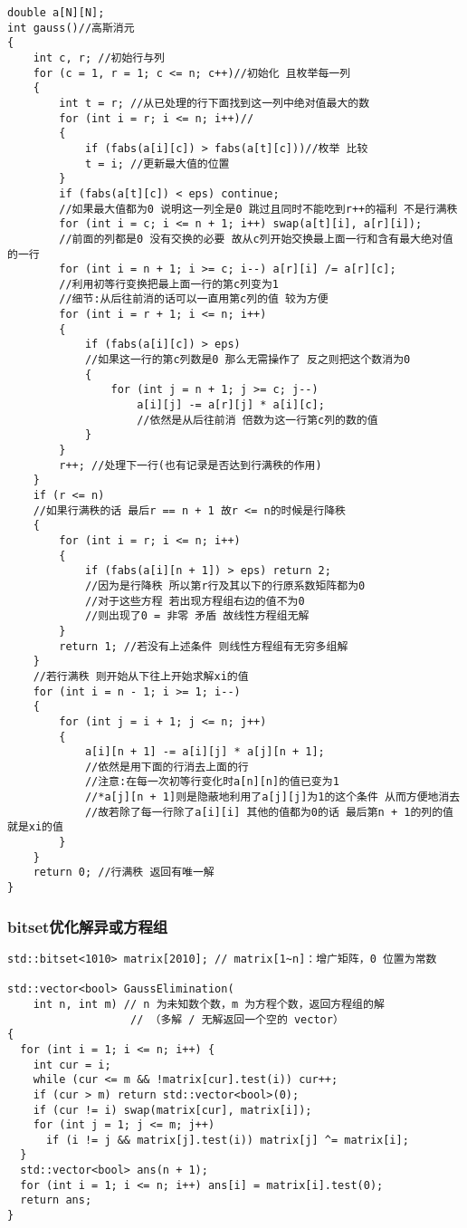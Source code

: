 \documentclass[a4paper, fontset=none]{ctexart}
\begin{document}
\begin{verbatim}
double a[N][N];
int gauss()//高斯消元
{
    int c, r; //初始行与列
    for (c = 1, r = 1; c <= n; c++)//初始化 且枚举每一列
    {
        int t = r; //从已处理的行下面找到这一列中绝对值最大的数
        for (int i = r; i <= n; i++)//
        {
            if (fabs(a[i][c]) > fabs(a[t][c]))//枚举 比较
            t = i; //更新最大值的位置
        }
        if (fabs(a[t][c]) < eps) continue;
        //如果最大值都为0 说明这一列全是0 跳过且同时不能吃到r++的福利 不是行满秩
        for (int i = c; i <= n + 1; i++) swap(a[t][i], a[r][i]);
        //前面的列都是0 没有交换的必要 故从c列开始交换最上面一行和含有最大绝对值的一行
        for (int i = n + 1; i >= c; i--) a[r][i] /= a[r][c];
        //利用初等行变换把最上面一行的第c列变为1
        //细节:从后往前消的话可以一直用第c列的值 较为方便
        for (int i = r + 1; i <= n; i++)
        {
            if (fabs(a[i][c]) > eps)
            //如果这一行的第c列数是0 那么无需操作了 反之则把这个数消为0
            {
                for (int j = n + 1; j >= c; j--)
                    a[i][j] -= a[r][j] * a[i][c];
                    //依然是从后往前消 倍数为这一行第c列的数的值
            }
        }
        r++; //处理下一行(也有记录是否达到行满秩的作用)
    }
    if (r <= n)
    //如果行满秩的话 最后r == n + 1 故r <= n的时候是行降秩
    {
        for (int i = r; i <= n; i++)
        {
            if (fabs(a[i][n + 1]) > eps) return 2;
            //因为是行降秩 所以第r行及其以下的行原系数矩阵都为0
            //对于这些方程 若出现方程组右边的值不为0
            //则出现了0 = 非零 矛盾 故线性方程组无解
        }
        return 1; //若没有上述条件 则线性方程组有无穷多组解
    }
    //若行满秩 则开始从下往上开始求解xi的值
    for (int i = n - 1; i >= 1; i--)
    {
        for (int j = i + 1; j <= n; j++)
        {
            a[i][n + 1] -= a[i][j] * a[j][n + 1];
            //依然是用下面的行消去上面的行
            //注意:在每一次初等行变化时a[n][n]的值已变为1
            //*a[j][n + 1]则是隐蔽地利用了a[j][j]为1的这个条件 从而方便地消去
            //故若除了每一行除了a[i][i] 其他的值都为0的话 最后第n + 1的列的值就是xi的值
        }
    }
    return 0; //行满秩 返回有唯一解
}
\end{verbatim}
\subsubsection{bitset优化解异或方程组}

\begin{verbatim}
std::bitset<1010> matrix[2010]; // matrix[1~n]：增广矩阵，0 位置为常数

std::vector<bool> GaussElimination(
    int n, int m) // n 为未知数个数，m 为方程个数，返回方程组的解
                   // （多解 / 无解返回一个空的 vector）
{
  for (int i = 1; i <= n; i++) {
    int cur = i;
    while (cur <= m && !matrix[cur].test(i)) cur++;
    if (cur > m) return std::vector<bool>(0);
    if (cur != i) swap(matrix[cur], matrix[i]);
    for (int j = 1; j <= m; j++)
      if (i != j && matrix[j].test(i)) matrix[j] ^= matrix[i];
  }
  std::vector<bool> ans(n + 1);
  for (int i = 1; i <= n; i++) ans[i] = matrix[i].test(0);
  return ans;
}
\end{verbatim}
\end{document}
